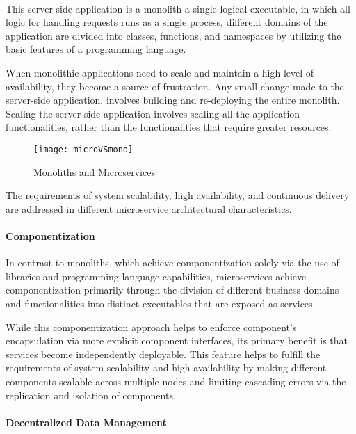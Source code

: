 \paragraph{}

This server-side application is a monolith a single logical executable, in which all logic for handling requests runs as a single process,
different domains of the application are divided into classes, functions, and namespaces by utilizing the basic features of a programming language.

When monolithic applications need to scale and maintain a high level of availability, they become a source of frustration.
Any small change made to the server-side application, involves building and re-deploying the entire monolith.
Scaling the server-side application involves scaling all the application functionalities, rather than the functionalities that require greater resources.

\begin{figure}[htbp]
    \centering
    \texttt{[image: microVSmono]}
    \caption{Monoliths and Microservices}
    \label{fig:monoliths and microservices}
\end{figure}

The requirements of system scalability, high availability, and continuous delivery are addressed in different microservice architectural characteristics.

\paragraph{Componentization}

In contrast to monoliths, which achieve componentization solely via the use of libraries and programming language capabilities,
microservices achieve componentization primarily through the division of different business domains and functionalities into distinct executables
that are exposed as services.

While this componentization approach helps to enforce component's encapsulation via more explicit component interfaces,
its primary benefit is that services become independently deployable.
This feature helps to fulfill the requirements of system scalability and high availability by
making different components scalable across multiple nodes and limiting cascading errors via the replication and isolation of components.

\paragraph{Decentralized Data Management}

